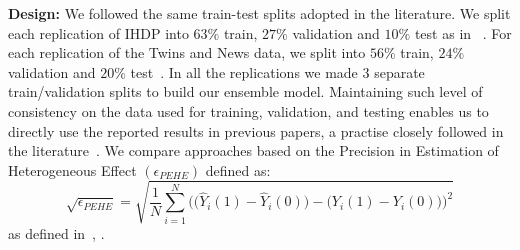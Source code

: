 \documentclass[sigconf]{acmart}
\newcommand{\eat}[1]{}
\theoremstyle{plain}
\numberwithin{equation}{section}
\begin{document}
\textbf{Design:} We followed the same train-test splits adopted in the literature. We split each replication of IHDP into $63\%$ train, $27\%$ validation and $10\%$ test as in ~\cite{Dragonnet}. For each replication of the Twins and News data, we split into $56\%$ train, $24\%$ validation and $20\%$ test~\cite{GANITE, learningRepresentations}. In all the replications we made 3 separate train/validation splits to build our ensemble model. Maintaining such level of consistency on the data used for training, validation, and testing enables us to directly use the reported results in previous papers, a practise closely followed in the literature~\cite{dnnShalit, GANITE, Dragonnet}. We compare approaches based on the Precision in Estimation of Heterogeneous Effect $\left(\epsilon_{PEHE}\right)$ defined as: $$\sqrt{\epsilon_{PEHE}} = \sqrt{\frac{1}{N}\sum_{i=1}^{N}\Big(\big(\hat{Y}_i(1)-\hat{Y}_i(0)\big) - \big(Y_i(1) - Y_i(0)\big)\Big)^2}$$ as defined in~\cite{ihdpHill}, \cite{GANITE}.
 \eat{and the error in Average Treatment Effect \big($\epsilon_{ATE} = ${\scriptsize$\frac{1}{N}\sum_{i=1}^{N}\big((\hat{Y}_i(1)-\hat{Y}_i(0)) - (Y_i(1) - Y_i(0))\big)$} \Big) }
\end{document}
